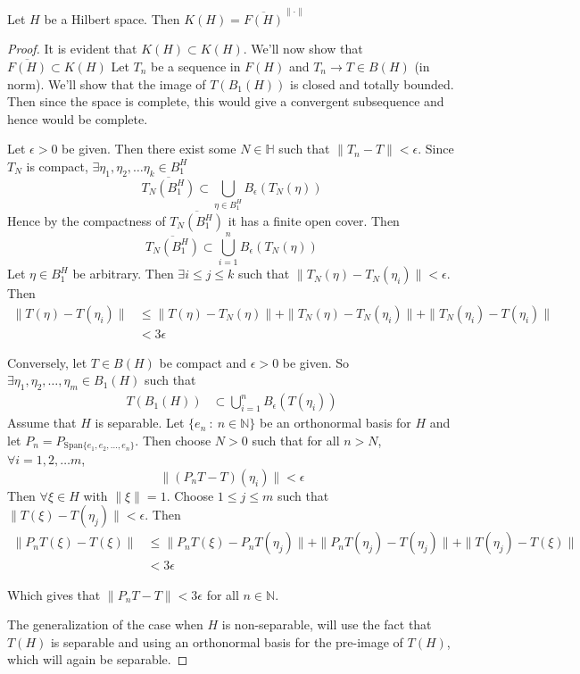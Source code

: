 \begin{theorem}
  Let $H$ be a Hilbert space. Then $K(H) = \overline{F(H)}^{\|\cdot\|}$
\end{theorem}
\begin{proof}
  It is evident that $K(H) \subset K(H)$. We'll now show that
  $\overline{F(H)}\subset K(H) $
  Let $T_n$ be a sequence in $F(H)$ and $T_n \to T \in B(H)$ (in
  norm). We'll show that the image of $T(B_1(H))$ is closed and
  totally bounded. Then since the space is complete, this would give
  a convergent subsequence and hence would be complete.

  Let $\epsilon > 0$ be given. Then there exist some $N \in
  \mathbb{H}$ such that $\|T_n - T\| < \epsilon$. Since $T_N$ is
  compact, $\exists \eta_1, \eta_2, \ldots \eta_k \in B^H_1$ \[
    \overline{T_N(B_1^H)} \subset \bigcup_{\eta \in  B_1^H}
    B_\epsilon(T_N(\eta))
  \]
  Hence by the compactness of $\overline{T_N(B_1^H)}$ it has a finite
  open cover. Then \[
    \overline{T_N(B_1^H)} \subset \bigcup_{i = 1}^{n}B_\epsilon(T_N(\eta))
  \]
  Let $\eta \in B_1^H$ be arbitrary. Then $\exists i \le j \le k$
  such that $\|T_N(\eta) - T_N(\eta_i)\| < \epsilon$. Then
  \begin{align*}
    \|T(\eta) - T(\eta_i)\| &\le \|T(\eta) - T_N(\eta)\| + \|T_N(\eta)
    - T_N(\eta_i)\| + \|T_N(\eta_i) - T(\eta_i)\| \\
    & < 3 \epsilon
  \end{align*}

  Conversely, let $T \in B(H)$ be compact and $\epsilon>0$ be given.
  So $\exists \eta_1, \eta_2, \ldots , \eta_m \in B_1(H)$ such that
  \begin{align*}
    T(B_1(H)) &\subset \bigcup_{i = 1}^{n}B_\epsilon(T(\eta_i))
  \end{align*}
  Assume that $H$ is separable. Let $\{ e_n  \ : \  n \in
  \mathbb{N} \}$ be an orthonormal basis for $H$ and let $P_n =
  P_{\textrm{Span}\{e_1 , e_2 , \ldots , e_n\}}$. Then choose $ N>0$
  such that for all $n >N$, $\forall i = 1, 2, \ldots m$, \[
    \|(P_nT - T)(\eta_i)\| < \epsilon
  \]
  Then $\forall \xi \in H$ with $\|\xi\| = 1$. Choose $1 \le j \le
  m$ such that $\|T(\xi) - T(\eta_j)\| < \epsilon$. Then
  \begin{align*}
    \|P_nT(\xi) - T(\xi)\| & \le \|P_nT(\xi) - P_nT(\eta_j)\| +
    \|P_nT(\eta_j) - T(\eta_j)\| + \|T(\eta_j) - T(\xi)\| \\
    &< 3\epsilon
  \end{align*}

  Which gives that $\|P_nT - T\| < 3\epsilon$ for all $n \in \mathbb{N}$.

  The generalization of the case when $H$ is non-separable, will use
  the fact that $T(H)$ is separable and using an orthonormal basis
  for the pre-image of $T(H)$, which will again be separable.
\end{proof}

